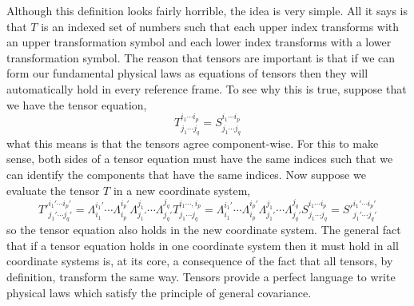 \documentclass[11pt, a4paper]{article}
\begin{document}
Although this definition looks fairly horrible, the idea is very simple. All it says is that $T$ is an indexed set of numbers such that each upper index transforms with an upper transformation symbol and each lower index transforms with a lower transformation symbol. The reason that tensors are important is that if we can form our fundamental physical laws as equations of tensors then they will automatically hold in every reference frame. To see why this is true, suppose that we have the tensor equation, 
\[T^{i_1 \cdots i_p}_{j_1 \cdots j_q} = S^{i_1 \cdots i_p}_{j_1 \cdots j_q}\]
what this means is that the tensors agree component-wise. For this to make sense, both sides of a tensor equation must have the same indices such that we can identify the components that have the same indices. Now suppose we evaluate the tensor $T$ in a new coordinate system,
\[ T'^{i_1' \cdots i_p'}_{j_1' \cdots j_q'} = \Lambda^{i_1'}_{i_1} \cdots \Lambda^{i_p'}_{i_p} \Lambda^{j_1}_{j_1'} \cdots \Lambda^{j_q}_{j_q'} T^{i_1 \cdots, i_p}_{j_1 \cdots j_q} = \Lambda^{i_1'}_{i_1} \cdots \Lambda^{i_p'}_{i_p} \Lambda^{j_1}_{j_1'} \cdots \Lambda^{j_q}_{j_q'} S^{i_1 \cdots i_p}_{j_1 \cdots j_q} = S'^{i_1' \cdots i_p'}_{j_1' \cdots j_q'} \]
so the tensor equation also holds in the new coordinate system. The general fact that if a tensor equation holds in one coordinate system then it must hold in all coordinate systems is, at its core, a consequence of the fact that all tensors, by definition, transform the same way. Tensors provide a perfect language to write physical laws which satisfy the principle of general covariance.  
\end{document}
